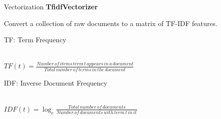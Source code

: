 \documentclass{beamer}
\begin{document}


\begin{frame}{Vectorization}
    \textbf {TfidfVectorizer}
    \par Convert a collection of raw documents to a matrix of TF-IDF features.
    \par TF: Term Frequency
    \begin{center}
    \\ $TF(t)=\frac{Number\, of\, items\, term\, t\, appears\, in\, a\, document}{Total\, number\, of\, terms\, in\, the\, document}$
    \end{center}
    \par IDF: Inverse Document Frequency
    \begin{center}
    \\ $IDF(t)=\log_{e}\frac{Total\, number\, of\, documents}{Number\, of\, documents\, with\, term\, t\, in\, it\,}$
    \end{center}
\end{frame}
\end{document}
